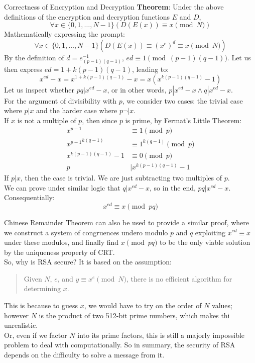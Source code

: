 \begin{ln-theorem}{Correctness of Encryption and Decryption}{}
    \textbf{Theorem}: Under the above definitions of the encryption and decryption functions $E$ and $D$,
    \[\forall x \in \{0, 1, \dots, N - 1\} (D(E(x)) \equiv x\pmod{N})\]
    \tcblower
    Mathematically expressing the prompt:
    \[\forall x \in \{0, 1, \dots, N - 1\} (D(E(x)) \equiv {(x^e)}^d \equiv x\pmod{N})\]
    By the definition of $d = {e}_{(p - 1)(q - 1)}^{-1}$, $ed \equiv 1\pmod{(p - 1)(q - 1)}$. Let us then express $ed = 1 + k(p - 1)(q - 1)$, leading to:
    \[x^{ed} - x = x^{1 + k(p - 1)(q - 1)} - x = x(x^{k(p - 1)(q - 1)} - 1)\]
    Let us inspect whether $pq | x^{ed} - x$, or in other words, $p | x^{ed} - x \land q | x^{ed} - x$. \\
    For the argument of divisibility with $p$, we consider two cases: the trivial case where $p | x$ and the harder case where $p \neg| x$. \\
    If $x$ is not a multiple of $p$, then since $p$ is prime, by Fermat's Little Theorem:
    \begin{align*}
        x^{p - 1} &\equiv 1\pmod{p} \\
        {x^{p - 1}}^{k(q - 1)} &\equiv 1^{k(q - 1)}\pmod{p} \\
        x^{k(p - 1)(q - 1)} - 1 &\equiv 0\pmod{p} \\
        p &| x^{k(p - 1)(q - 1)} - 1
    \end{align*}
    If $p | x$, then the case is trivial. We are just subtracting two multiples of $p$. \\
    We can prove under similar logic that $q | x^{ed} - x$, so in the end, $pq | x^{ed} - x$. \\
    Consequentially:
    \[x^{ed} \equiv x\pmod{pq}\]
\end{ln-theorem}
Chinese Remainder Theorem can also be used to provide a similar proof, where we construct a system of congruences undero modulo $p$ and $q$ exploiting $x^{ed} \equiv x$ under these modulos, and finally find $x\pmod{pq}$ to be the only viable solution by the uniqueness property of CRT. \\
So, why is RSA secure? It is based on the assumption:
\begin{quote}
    Given $N$, $e$, and $y \equiv x^e \pmod{N}$, there is no efficient algorithm for determining $x$.
\end{quote}
This is because to guess $x$, we would have to try on the order of $N$ values; however $N$ is the product of two 512-bit prime numbers, which makes thi unrealistic. \\
Or, even if we factor $N$ into its prime factors, this is still a majorly impossible problem to deal with computationally.
So in summary, the security of RSA depends on the difficulty to solve a message from it. \\

